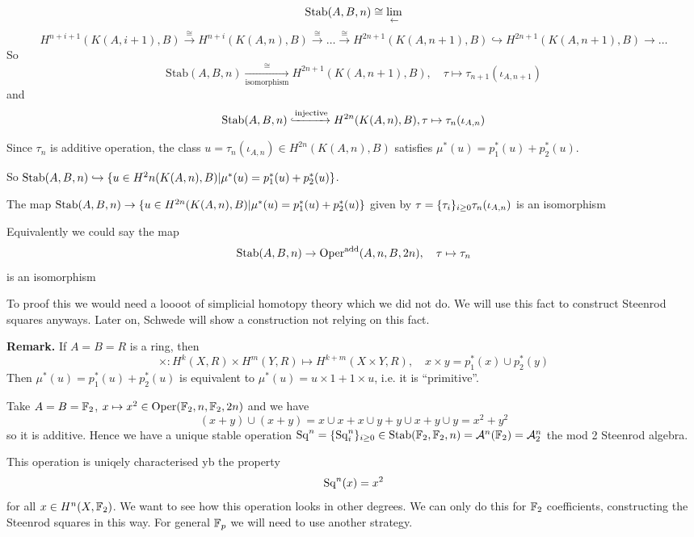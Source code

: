 \documentclass[language=english]{TemplateLecture}
\begin{document}
\begin{corollary}
    \[\mathrm{Stab}(A,B,n) \cong \lim_{\leftarrow} \]
    \[H^{n+i+1}(K(A,i+1), B)\xrightarrow{\cong} H^{n+i}(K(A,n),B) \xrightarrow{\cong}\dots\xrightarrow{\cong} H^{2n+1}(K(A,n+1),B)\hookrightarrow H^{2n+1}(K(A,n+1), B)\to \dots \]
    So
    \[\mathrm{Stab}(A,B,n)\xrightarrow[\text{isomorphism}]{\cong} H^{2n+1}(K(A,n+1), B), \quad \tau\mapsto \tau_{n+1}(\iota_{A,n+1})\]
    and
    \[\mathrm{Stab}(A,B,n)\xhookrightarrow{\text{injective}} H^{2n}(K(A,n), B), \tau\mapsto \tau_n(\iota_{A,n})\]
\end{corollary}

Since \(\tau_n\) is additive operation, the class \(u = \tau_n(\iota_{A,n}) \in H^{2n}(K(A,n), B)\) satisfies \(\mu^*(u) = p_1^*(u)+ p_2^*(u)\).

So \(\mathrm{Stab}(A,B,n)\hookrightarrow \{u \in H^2n(K(A,n),B) | \mu^*(u) = p_1^*(u) + p_2^*(u)\}\).

\begin{thm}{}{}
    The map \(\mathrm{Stab}(A,B,n)\to \{u \in H^{2n}(K(A,n), B) | \mu^*(u) = p_1^*(u)+ p_2^*(u)\}\) given by \(\tau =\{\tau_i\}_{i\geq 0} \tau_n(\iota_{A,n})\) is an isomorphism
\end{thm}

Equivalently we could say the map
\[\mathrm{Stab}(A,B,n)\to \mathrm{Oper}^{\text{add}}(A,n,B,2n), \quad \tau\mapsto \tau_n\]
is an isomorphism

To proof this we would need a loooot of simplicial homotopy theory which we did not do. We will use this fact to construct Steenrod squares anyways. Later on, Schwede will show a construction not relying on this fact.

\textbf{Remark.} If \(A = B= R\) is a ring, then
\[\times \colon H^k(X,R)\times H^m(Y, R) \mapsto H^{k+m}(X\times Y, R), \quad x \times y = p_1^*(x)\cup p_2^*(y)\]
Then \(\mu^*(u) = p_1^*(u) + p_2^*(u)\) is equivalent to \(\mu^*(u) = u\times 1+ 1\times u\), i.e. it is \enquote{primitive}.

\begin{example}
    Take \(A = B = \mathbb{F}_2\), \(x\mapsto x^2 \in \mathrm{Oper}(\mathbb{F}_2, n, \mathbb{F}_2, 2n)\) and we have
    \[(x+y) \cup (x+ y) = x\cup x + x\cup y + y \cup x + y\cup y = x^2 + y^2\]
    so it is additive. Hence we have a unique stable operation \(\mathrm{Sq}^n = \{\mathrm{Sq}^n_i\}_{i\geq 0}\in \mathrm{Stab}(\mathbb{F}_2, \mathbb{F}_2, n) = \mathcal{A}^n(\mathbb{F}_2) = \mathcal{A}^n_2\) the mod 2 Steenrod algebra.

    This operation is uniqely characterised yb the property
    \[\mathrm{Sq}^n(x) = x^2\]
    for all \(x \in H^n(X, \mathbb{F}_2)\). We want to see how this operation looks in other degrees. We can only do this for \(\mathbb{F}_2\) coefficients, constructing the Steenrod squares in this way. For general \(\mathbb{F}_p\) we will need to use another strategy.
\end{example}
\end{document}
